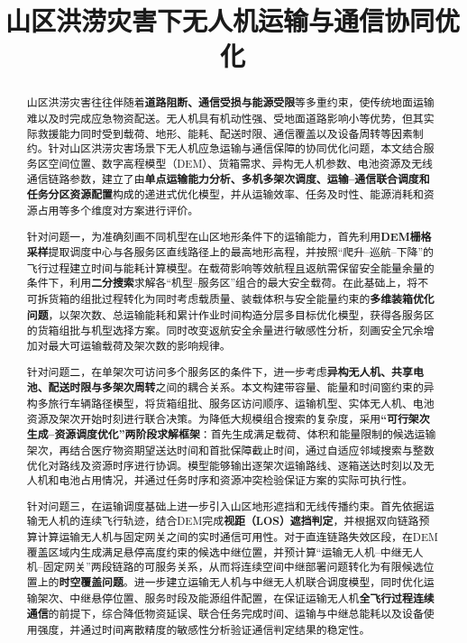 \documentclass[bwprint,fontset=fandol]{gmcmthesis}
\title{山区洪涝灾害下无人机运输与通信协同优化
}
\begin{document}
\maketitle

\begin{abstract}

山区洪涝灾害往往伴随着\textbf{道路阻断、通信受损与能源受限}等多重约束，使传统地面运输难以及时完成应急物资配送。无人机具有机动性强、受地面道路影响小等优势，但其实际救援能力同时受到载荷、地形、能耗、配送时限、通信覆盖以及设备周转等因素制约。针对山区洪涝灾害场景下无人机应急运输与通信保障的协同优化问题，本文结合服务区空间位置、数字高程模型（DEM）、货箱需求、异构无人机参数、电池资源及无线通信链路参数，建立了由\textbf{单点运输能力分析、多机多架次调度、运输--通信联合调度和任务分区资源配置}构成的递进式优化模型，并从运输效率、任务及时性、能源消耗和资源占用等多个维度对方案进行评价。

针对问题一，为准确刻画不同机型在山区地形条件下的运输能力，首先利用\textbf{DEM栅格采样}提取调度中心与各服务区直线路径上的最高地形高程，并按照“爬升--巡航--下降”的飞行过程建立时间与能耗计算模型。在载荷影响等效航程且返航需保留安全能量余量的条件下，利用\textbf{二分搜索}求解各“机型--服务区”组合的最大安全载荷。在此基础上，将不可拆货箱的组批过程转化为同时考虑载质量、装载体积与安全能量约束的\textbf{多维装箱优化问题}，以架次数、总运输能耗和累计作业时间构造分层多目标优化模型，获得各服务区的货箱组批与机型选择方案。同时改变返航安全余量进行敏感性分析，刻画安全冗余增加对最大可运输载荷及架次数的影响规律。

针对问题二，在单架次可访问多个服务区的条件下，进一步考虑\textbf{异构无人机、共享电池、配送时限与多架次周转}之间的耦合关系。本文构建带容量、能量和时间窗约束的异构多旅行车辆路径模型，将货箱组批、服务区访问顺序、运输机型、实体无人机、电池资源及架次开始时刻进行联合决策。为降低大规模组合搜索的复杂度，采用\textbf{“可行架次生成--资源调度优化”两阶段求解框架}：首先生成满足载荷、体积和能量限制的候选运输架次，再结合医疗物资期望送达时间和首批保障截止时间，通过自适应邻域搜索与整数优化对路线及资源时序进行协调。模型能够输出逐架次运输路线、逐箱送达时刻以及无人机和电池占用情况，并通过任务时序和资源冲突检验保证方案的实际可执行性。

针对问题三，在运输调度基础上进一步引入山区地形遮挡和无线传播约束。首先依据运输无人机的连续飞行轨迹，结合DEM完成\textbf{视距（LOS）遮挡判定}，并根据双向链路预算计算运输无人机与固定网关之间的实时通信可用性。对于直连链路失效区段，在DEM覆盖区域内生成满足悬停高度约束的候选中继位置，并预计算“运输无人机--中继无人机--固定网关”两段链路的可服务关系，从而将连续空间中继部署问题转化为有限候选位置上的\textbf{时空覆盖问题}。进一步建立运输无人机与中继无人机联合调度模型，同时优化运输架次、中继悬停位置、服务时段及能源组件配置，在保证运输无人机\textbf{全飞行过程连续通信}的前提下，综合降低物资延误、联合任务完成时间、运输与中继总能耗以及设备使用强度，并通过时间离散精度的敏感性分析验证通信判定结果的稳定性。


\end{abstract}
\end{document}
